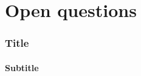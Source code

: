 \documentclass[aspectratio=169,11pt,usenames,dvipsnames]{beamer}
\begin{document}
\section{Open questions}

\begin{frame}
    \frametitle{Title}
    \framesubtitle{Subtitle}
\end{frame}





\end{document}

